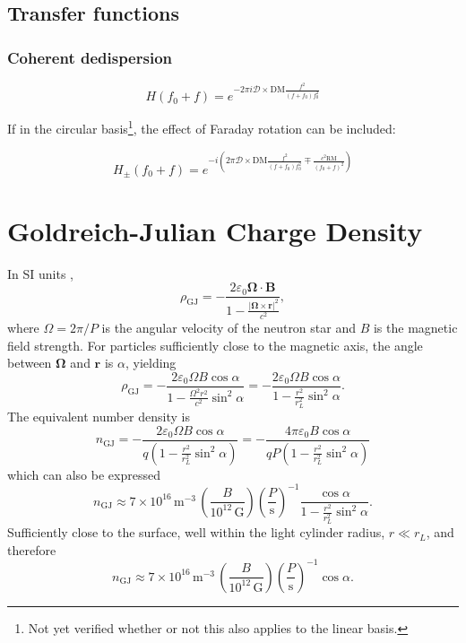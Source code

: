 \documentclass{book}
\begin{document}
\subsection{Transfer functions}

\subsubsection{Coherent dedispersion}

\begin{equation}
    H(f_0 + f) = e^{-2\pi i \mathcal{D}\times\text{DM}\frac{f^2}{(f+f_0) f_0^2}}
\end{equation}

If in the circular basis\footnote{Not yet verified whether or not this also applies to the linear basis.}, the effect of Faraday rotation can be included:

\begin{equation}
    H_\pm(f_0 + f) = e^{-i \left(2\pi\mathcal{D}\times\text{DM}\frac{f^2}{(f+f_0) f_0^2} \mp \frac{c^2\text{RM}}{(f_0+f)^2}\right)}
\end{equation}

\section{Goldreich-Julian Charge Density}

In SI units \citep[e.g.][]{Fung2006},
\begin{equation}
    \rho_\text{GJ} = -\frac{2\varepsilon_0 {\bm \Omega}\cdot{\bm B}}{1 - \frac{|{\bm \Omega}\times{\bm r}|^2}{c^2}},
\end{equation}
where $\Omega = 2\pi/P$ is the angular velocity of the neutron star and $B$ is the magnetic field strength.
For particles sufficiently close to the magnetic axis, the angle between ${\bm \Omega}$ and ${\bm r}$ is $\alpha$, yielding
\begin{equation}
    \rho_\text{GJ}
        = -\frac{2\varepsilon_0 \Omega B \cos\alpha}{1 - \frac{\Omega^2 r^2}{c^2}\sin^2\alpha}
        = -\frac{2\varepsilon_0 \Omega B \cos\alpha}{1 - \frac{r^2}{r_L^2}\sin^2\alpha}.
\end{equation}
The equivalent number density is
\begin{equation}
    n_\text{GJ}
        = -\frac{2\varepsilon_0 \Omega B \cos\alpha}{q\left(1 - \frac{r^2}{r_L^2}\sin^2\alpha\right)}
        = -\frac{4\pi\varepsilon_0 B \cos\alpha}{qP\left(1 - \frac{r^2}{r_L^2}\sin^2\alpha\right)}
\end{equation}
which can also be expressed
\begin{equation}
    n_\text{GJ} \approx 7 \times 10^{16}\,\text{m}^{-3} \, \left(\frac{B}{10^{12}\,\text{G}}\right) \left(\frac{P}{\text{s}}\right)^{-1} \frac{\cos\alpha}{1 - \frac{r^2}{r_L^2}\sin^2\alpha}.
\end{equation}
Sufficiently close to the surface, well within the light cylinder radius, $r \ll r_L$, and therefore
\begin{equation}
    n_\text{GJ} \approx 7 \times 10^{16}\,\text{m}^{-3} \, \left(\frac{B}{10^{12}\,\text{G}}\right) \left(\frac{P}{\text{s}}\right)^{-1} \cos\alpha.
\end{equation}
\end{document}
